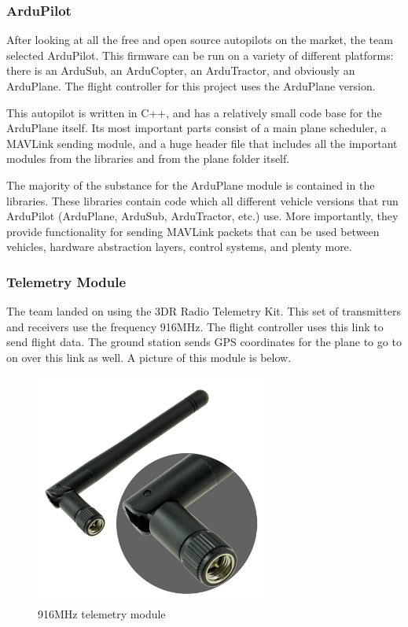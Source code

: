 \documentclass[12pt,journal,compsoc]{IEEEtran}
\begin{document}
\subsubsection{ArduPilot}
After looking at all the free and open source autopilots on the market, the team selected ArduPilot. This firmware can be run on a variety of different platforms: there is an ArduSub, an ArduCopter, an ArduTractor, and obviously an ArduPlane. The flight controller for this project uses the ArduPlane version. 

This autopilot is written in C++, and has a relatively small code base for the ArduPlane itself. Its most important parts consist of a main plane scheduler, a MAVLink sending module, and a huge header file that includes all the important modules from the libraries and from the plane folder itself. 

The majority of the substance for the ArduPlane module is contained in the libraries. These libraries contain code which all different vehicle versions that run ArduPilot (ArduPlane, ArduSub, ArduTractor, etc.) use. More importantly, they provide functionality for sending MAVLink packets that can be used between vehicles, hardware abstraction layers, control systems, and plenty more. 

\subsubsection{Telemetry Module}
The team landed on using the 3DR Radio Telemetry Kit. This set of transmitters and receivers use the frequency 916MHz. The flight controller uses this link to send flight data. The ground station sends GPS coordinates for the plane to go to on over this link as well. A picture of this module is below.
\begin{figure}[h!]
\hspace*{0cm}
\centering
\includegraphics[width=3in]{telemmodule.jpg}
\caption{916MHz telemetry module}
\label{mavStruct}
\end{figure}
\end{document}
